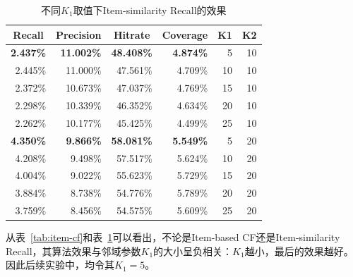     \begin{table}[htbp]
      \centering
      \caption{不同$K_1$取值下Item-similarity Recall的效果}
      \begin{tabular}{rrrrrr}
        \toprule
        \multicolumn{1}{c}{Recall} & \multicolumn{1}{c}{Precision} & \multicolumn{1}{c}{Hit\;rate} & \multicolumn{1}{c}{Coverage} & \multicolumn{1}{c}{K1} & \multicolumn{1}{c}{K2} \\
        \midrule
        \textbf{2.437\%} & \textbf{11.002\%} & \textbf{48.408\%} & \textbf{4.874\%} & 5    & 10 \\
        2.445\% & 11.000\% & 47.561\% & 4.709\% & 10   & 10 \\
        2.372\% & 10.673\% & 47.037\% & 4.769\% & 15   & 10 \\
        2.298\% & 10.339\% & 46.352\% & 4.634\% & 20   & 10 \\
        2.262\% & 10.177\% & 45.425\% & 4.499\% & 25   & 10 \\
        \textbf{4.350\%} & \textbf{9.866\%} & \textbf{58.081\%} & \textbf{5.549\%} & 5    & 20 \\
        4.208\% & 9.498\% & 57.517\% & 5.624\% & 10   & 20 \\
        4.004\% & 9.022\% & 55.623\% & 5.729\% & 15   & 20 \\
        3.884\% & 8.738\% & 54.776\% & 5.789\% & 20   & 20 \\
        3.759\% & 8.456\% & 54.575\% & 5.609\% & 25   & 20 \\
        \bottomrule
      \end{tabular}%
      \label{tab:item-similarity}%
    \end{table}%

    从表~\ref{tab:item-cf}和表~\ref{tab:item-similarity}可以看出，不论是Item-based CF还是Item-similarity Recall，其算法效果与邻域参数$K_1$的大小呈负相关：$K_1$越小，最后的效果越好。因此后续实验中，均令其$K_1=5$。

